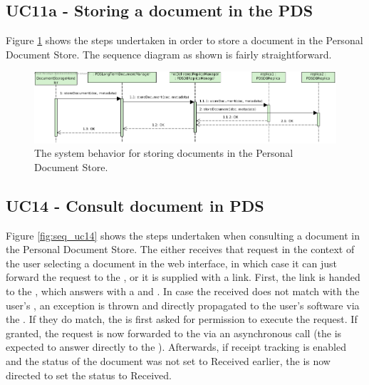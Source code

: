 \subsection{UC11a - Storing a document in the PDS}
Figure \ref{fig:seq_uc11a} shows the steps undertaken in order to store a document in the Personal Document Store. The sequence diagram as shown is fairly straightforward.

\begin{figure}[!htp]
    \centering
    \includegraphics[width=\textwidth]{figures/UC11a - Storing a document in the PDS.png}
    \caption{The system behavior for storing documents in the Personal Document Store.
        }\label{fig:seq_uc11a}
\end{figure}

\subsection{UC14 - Consult document in PDS}
Figure \ref{fig:seq_uc14} shows the steps undertaken when consulting a document in the Personal Document Store. The  either receives that request in the context of the user selecting a document in the web interface, in which case it can just forward the request to the , or it is supplied with a link. First, the link is handed to the  , which answers with a  and . In case the received  does not match with the user's , an exception is thrown and directly propagated to the user's software via the . If they do match, the  is first asked for permission to execute the request. If granted, the request is now forwarded to the  via an asynchronous call (the  is expected to answer directly to the ). Afterwards, if receipt tracking is enabled and the status of the document was not set to Received earlier, the  is now directed to set the status to Received.

